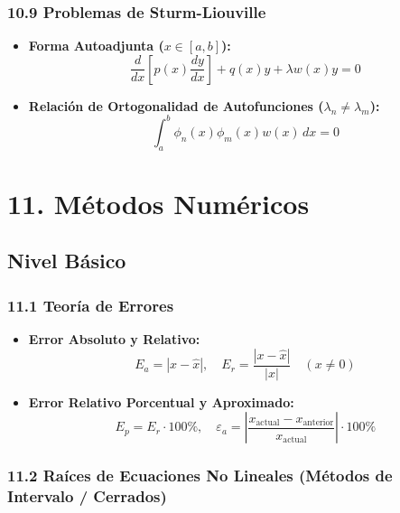 \documentclass[11pt,a4paper]{article}
\begin{document}
\subsubsection*{10.9 Problemas de Sturm-Liouville}

\begin{itemize}
  \item \textbf{Forma Autoadjunta ($x \in [a, b]$):}
  \[
    \frac{d}{dx}\left[ p(x)\frac{dy}{dx} \right] + q(x)y + \lambda w(x)y = 0
  \]
  \item \textbf{Relación de Ortogonalidad de Autofunciones ($\lambda_n \ne \lambda_m$):}
  \[
    \int_a^b \phi_n(x)\phi_m(x)w(x) \, dx = 0
  \]
\end{itemize}

\section*{11. Métodos Numéricos}

\subsection*{Nivel Básico}

\subsubsection*{11.1 Teoría de Errores}

\begin{itemize}
  \item \textbf{Error Absoluto y Relativo:}
  \[
    E_a = |x - \hat{x}|, \quad E_r = \frac{|x - \hat{x}|}{|x|} \quad (x \ne 0)
  \]
  \item \textbf{Error Relativo Porcentual y Aproximado:}
  \[
    E_p = E_r \cdot 100\%, \quad \varepsilon_a = \left|\frac{x_{\text{actual}} - x_{\text{anterior}}}{x_{\text{actual}}}\right| \cdot 100\%
  \]
\end{itemize}

\subsubsection*{11.2 Raíces de Ecuaciones No Lineales (Métodos de Intervalo / Cerrados)}
\end{document}
